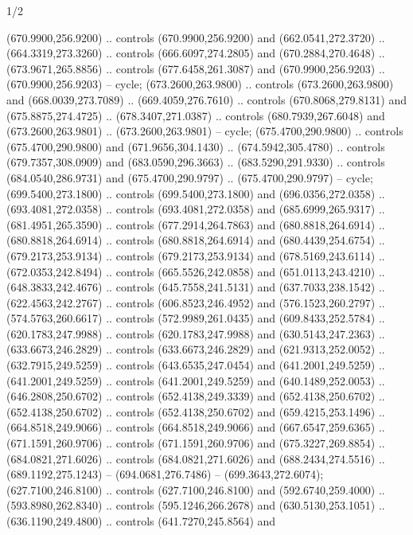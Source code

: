 \begin{flagdescription}{1/2}
\begin{scope}[xshift=0.5\flaglength,yshift=0.5\flagwidth,scale=\flagwidth/759]
\begin{scope}[y=0.8pt, x=0.8pt, yscale=-1,shift={(-720,-480)}]
\begin{scope}[draw=black,fill=c452c25,line width=0.438\lw]
 (670.9900,256.9200) .. controls (670.9900,256.9200) and
  (662.0541,272.3720) .. (664.3319,273.3260) .. controls (666.6097,274.2805) and
  (670.2884,270.4648) .. (673.9671,265.8856) .. controls (677.6458,261.3087) and
  (670.9900,256.9203) .. (670.9900,256.9203) -- cycle;
 (673.2600,263.9800) .. controls (673.2600,263.9800) and
  (668.0039,273.7089) .. (669.4059,276.7610) .. controls (670.8068,279.8131) and
  (675.8875,274.4725) .. (678.3407,271.0387) .. controls (680.7939,267.6048) and
  (673.2600,263.9801) .. (673.2600,263.9801) -- cycle;
 (675.4700,290.9800) .. controls (675.4700,290.9800) and
  (671.9656,304.1430) .. (674.5942,305.4780) .. controls (679.7357,308.0909) and
  (683.0590,296.3663) .. (683.5290,291.9330) .. controls (684.0540,286.9731) and
  (675.4700,290.9797) .. (675.4700,290.9797) -- cycle;
 (699.5400,273.1800) .. controls (699.5400,273.1800) and
  (696.0356,272.0358) .. (693.4081,272.0358) .. controls (693.4081,272.0358) and
  (685.6999,265.9317) .. (681.4951,265.3590) .. controls (677.2914,264.7863) and
  (680.8818,264.6914) .. (680.8818,264.6914) .. controls (680.8818,264.6914) and
  (680.4439,254.6754) .. (679.2173,253.9134) .. controls (679.2173,253.9134) and
  (678.5169,243.6114) .. (672.0353,242.8494) .. controls (665.5526,242.0858) and
  (651.0113,243.4210) .. (648.3833,242.4676) .. controls (645.7558,241.5131) and
  (637.7033,238.1542) .. (622.4563,242.2767) .. controls (606.8523,246.4952) and
  (576.1523,260.2797) .. (574.5763,260.6617) .. controls (572.9989,261.0435) and
  (609.8433,252.5784) .. (620.1783,247.9988) .. controls (620.1783,247.9988) and
  (630.5143,247.2363) .. (633.6673,246.2829) .. controls (633.6673,246.2829) and
  (621.9313,252.0052) .. (632.7915,249.5259) .. controls (643.6535,247.0454) and
  (641.2001,249.5259) .. (641.2001,249.5259) .. controls (641.2001,249.5259) and
  (640.1489,252.0053) .. (646.2808,250.6702) .. controls (652.4138,249.3339) and
  (652.4138,250.6702) .. (652.4138,250.6702) .. controls (652.4138,250.6702) and
  (659.4215,253.1496) .. (664.8518,249.9066) .. controls (664.8518,249.9066) and
  (667.6547,259.6365) .. (671.1591,260.9706) .. controls (671.1591,260.9706) and
  (675.3227,269.8854) .. (684.0821,271.6026) .. controls (684.0821,271.6026) and
  (688.2434,274.5516) .. (689.1192,275.1243) -- (694.0681,276.7486) --
  (699.3643,272.6074);
 (627.7100,246.8100) .. controls (627.7100,246.8100) and
  (592.6740,259.4000) .. (593.8980,262.8340) .. controls (595.1246,266.2678) and
  (630.5130,253.1051) .. (636.1190,249.4800) .. controls (641.7270,245.8564) and

\end{scope}
\end{scope}
\end{scope}
\end{flagdescription}
